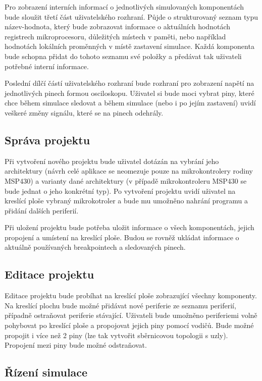 Pro zobrazení interních informací o jednotlivých simulovaných komponentách bude sloužit třetí část uživatelského rozhraní. Půjde o strukturovaný seznam
typu název-hodnota, který bude zobrazovat informace o aktuálních hodnotách registrech mikroprocesoru, důležitých místech v paměti, nebo například hodnotách
lokálních proměnných v místě zastavení simulace. Každá komponenta bude schopna přidat do tohoto seznamu své položky a předávat tak uživateli potřebné
interní informace.

Poslední dílčí částí uživatelského rozhraní bude rozhraní pro zobrazení napětí na jednotlivých pinech formou osciloskopu. Uživatel si bude moci vybrat
piny, které chce během simulace sledovat a během simulace (nebo i po jejím zastavení) uvidí veškeré změny signálu, které se na pinech odehrály.

\subsection{Správa projektu}

Při vytvoření nového projektu bude uživatel dotázán na vybrání jeho architektury (návrh celé aplikace se neomezuje pouze na mikrokontrolery rodiny MSP430) a varianty dané architektury (v případě mikrokontroleru MSP430 se bude jednat o jeho konkrétní typ). Po vytvoření projektu uvidí uživatel na kreslící ploše vybraný mikrokotroler a bude mu umožněno nahrání programu a přidání dalších periferií.

Při uložení projektu bude potřeba uložit informace o všech komponentách, jejich propojení a umístení na kreslící ploše. Budou se rovněž ukládat informace
o aktuálně používaných breakpointech a sledovaných pinech.

\subsection{Editace projektu}

Editace projektu bude probíhat na kreslící ploše zobrazující všechny komponenty. Na kreslící plochu bude možné přidávat nové periferie ze seznamu periferií, případně ostraňovat periferie stávající. Uživateli bude umožněno periferiemi volně pohybovat po kreslící ploše a propojovat jejich piny pomocí vodičů. Bude možné propojit i více než 2 piny (lze tak vytvořit sběrnicovou topologii s uzly). Propojení mezi piny bude možné odstraňovat.

\subsection{Řízení simulace}

